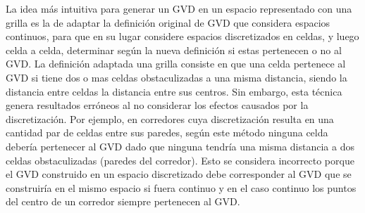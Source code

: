 La idea más intuitiva para generar un GVD en un espacio representado con una grilla es la de adaptar la definición original de GVD que considera espacios continuos, para que en su lugar considere espacios discretizados en celdas, y luego celda a celda, determinar según la nueva definición si estas pertenecen o no al GVD. La definición adaptada una grilla consiste en que una celda pertenece al GVD si tiene dos o mas celdas obstaculizadas a una misma distancia, siendo la distancia entre celdas la distancia entre sus centros. Sin embargo, esta técnica genera resultados erróneos al no considerar los efectos causados por la discretización. Por ejemplo, en corredores cuya discretización resulta en una cantidad par de celdas entre sus paredes, según este método ninguna celda debería pertenecer al GVD dado que ninguna  tendría una misma distancia a dos celdas obstaculizadas (paredes del corredor). Esto se considera incorrecto porque el GVD construido en un espacio discretizado debe corresponder al GVD que se construiría en el mismo espacio si fuera continuo y  en el caso continuo los puntos del centro de un corredor siempre pertenecen al GVD. %

